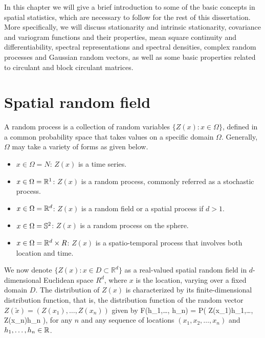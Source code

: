 

%

In this chapter we will give a brief introduction to some of the basic concepts in spatial statistics, which are necessary to follow for the rest of this dissertation. More specifically, we will discuss stationarity and intrinsic stationarity, covariance and variogram functions and their properties, mean square continuity and differentiability, spectral representations and spectral densities, complex random processes and Gaussian random vectors, as well as some basic properties related to circulant and block circulant matrices.   %


\section{Spatial random field}
A random process is a collection of random variables $\{Z(x): x \in \Omega\}$, defined in a common probability space that takes values on a specific domain $\Omega$. Generally, $\Omega$ may take a variety of forms as given below.

\begin{itemize}
	\item $x \in \Omega = N$: $Z(x)$ is a time series.
	\item $x \in \Omega = \mathbb{R}^1$: $Z(x)$ is a random process, commonly referred as a stochastic process.
	\item $x \in \Omega = \mathbb{R}^d$: $Z(x)$ is a random field or a spatial process if $d > 1$.
	\item $x \in \Omega = \mathbb{S}^2$: $Z(x)$ is a random process on the sphere.
	\item $x \in \Omega = \mathbb{R}^d\times R$: $Z(x)$ is a spatio-temporal process that involves both location and time.
\end{itemize}

We now denote $\{Z(x): x \in D \subset \mathbb{R}^d\}$ as a real-valued spatial random field in $d$-dimensional Euclidean space $R^d$, where $x$ is the location, varying over a fixed domain $D$. The distribution of $Z(x)$ is characterized by its finite-dimensional distribution function, that is, the distribution function of the random vector $ Z(\utilde{x})=(Z(x_1),\ldots, Z(x_n) )$ given by
\beq
F(h_1,\ldots, h_n) = P( Z(x_1)\le h_1,\ldots, Z(x_n)\le h_n ),
\eeq
for any $n$ and any sequence of locations $(x_1, x_2, \ldots, x_n)$ and $h_1,\ldots, h_n \in \mathbb{R}$.\\


